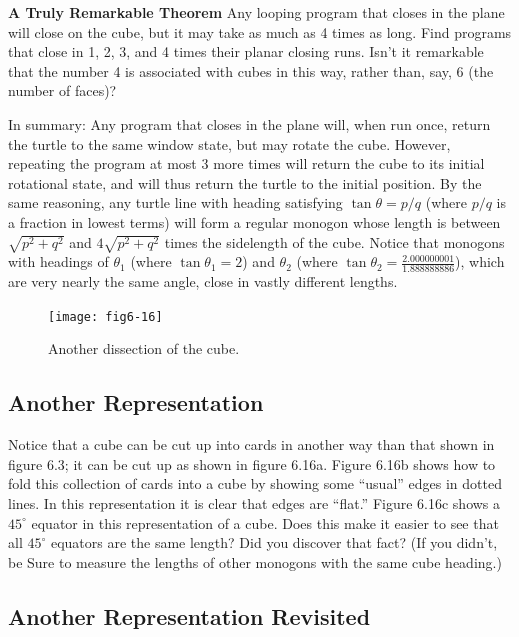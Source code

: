 \documentclass{book}
\begin{document}
\noindent \textbf{A Truly Remarkable Theorem} Any looping program that closes in the
plane will close on the cube, but it may take as much as 4 times as long.
Find programs that close in 1, 2, 3, and 4 times their planar closing
runs. Isn't it remarkable that the number 4 is associated with cubes in
this way, rather than, say, 6 (the number of faces)?

In summary: Any program that closes in the plane will, when run
once, return the turtle to the same window state, but may rotate the
cube. However, repeating the program at most 3 more times will return
the cube to its initial rotational state, and will thus return the turtle
to the initial position. By the same reasoning, any turtle line with
heading satisfying $\tan \theta = p/q$ (where $p/q$ is a fraction in lowest terms)
will form a regular monogon whose length is between $\sqrt{p^2 + q^2}$ and
$4 \sqrt{p^2 + q^2}$ times the sidelength of the cube. Notice that monogons with
headings of $\theta_1$ (where $\tan \theta_1 = 2$) and $\theta_2$ (where $\tan \theta_2 = \frac{2.000000001} {1.888888886}$), which are very nearly the same angle, close in vastly different
lengths.

\begin{figure}
\begin{center}
\texttt{[image: fig6-16]}
\caption{Another dissection of the cube.}
\end{center}
\end{figure}

\subsection{Another Representation}

Notice that a cube can be cut up into cards in another way than that
shown in figure 6.3; it can be cut up as shown in figure 6.16a. Figure
6.16b shows how to fold this collection of cards into a cube by showing
some ``usual'' edges in dotted lines. In this representation it is clear that
edges are ``flat.'' Figure 6.16c shows a $45^{\circ}$ equator in this representation
of a cube. Does this make it easier to see that all $45^{\circ}$ equators are the
same length? Did you discover that fact? (If you didn't, be Sure to
measure the lengths of other monogons with the same cube heading.)

\subsection{Another Representation Revisited}
\end{document}
